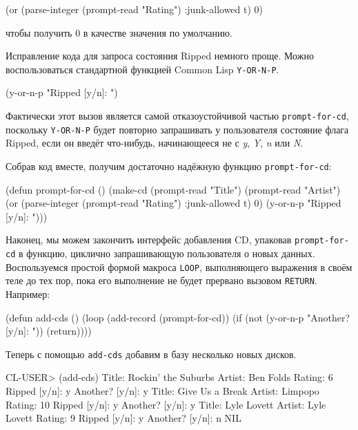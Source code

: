 \begin{myverb}
(or (parse-integer (prompt-read "Rating") :junk-allowed t) 0)
\end{myverb}

\noindent{}чтобы получить 0 в качестве значения по умолчанию.

Исправление кода для запроса состояния Ripped немного проще. Можно воспользоваться
стандартной функцией Common Lisp \lstinline{Y-OR-N-P}.

\begin{myverb}
(y-or-n-p "Ripped [y/n]: ")
\end{myverb}

Фактически этот вызов является самой отказоустойчивой частью \lstinline{prompt-for-cd},
поскольку \lstinline{Y-OR-N-P} будет повторно запрашивать у пользователя состояние флага
Ripped, если он введёт что-нибудь, начинающееся не с \textit{y}, \textit{Y}, \textit{n}
или \textit{N}.

Собрав код вместе, получим достаточно надёжную функцию \lstinline{prompt-for-cd}:

\begin{myverb}
(defun prompt-for-cd ()
  (make-cd
   (prompt-read "Title")
   (prompt-read "Artist")
   (or (parse-integer (prompt-read "Rating") :junk-allowed t) 0)
   (y-or-n-p "Ripped [y/n]: ")))
\end{myverb}

Наконец, мы можем закончить интерфейс добавления CD, упаковав \lstinline{prompt-for-cd} в
функцию, циклично запрашивающую пользователя о новых данных. Воспользуемся простой формой
макроса \lstinline{LOOP}, выполняющего выражения в своём теле до тех пор, пока его выполнение
не будет прервано вызовом \lstinline{RETURN}. Например:

\begin{myverb}
(defun add-cds ()
  (loop (add-record (prompt-for-cd))
      (if (not (y-or-n-p "Another? [y/n]: ")) (return))))
\end{myverb}

Теперь с помощью \lstinline{add-cds} добавим в базу несколько новых дисков.

\begin{myverb}
CL-USER> (add-cds)
Title: Rockin' the Suburbs
Artist: Ben Folds
Rating: 6
Ripped  [y/n]: y
Another?  [y/n]: y
Title: Give Us a Break
Artist: Limpopo
Rating: 10
Ripped  [y/n]: y
Another?  [y/n]: y
Title: Lyle Lovett
Artist: Lyle Lovett
Rating: 9
Ripped  [y/n]: y
Another?  [y/n]: n
NIL
\end{myverb}


